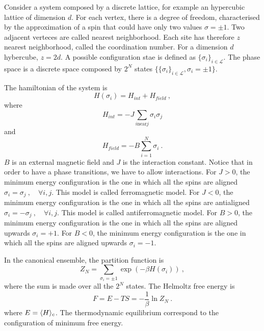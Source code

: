     Consider a system composed by a discrete lattice, for example an hypercubic lattice of dimension $d$. For each vertex, there is a degree of freedom, characterised by the approximation of a spin that could have only two values $\sigma = \pm 1$. Two adjacent verteces are called nearest neighborhood. Each site has therefore $z$ nearest neighborhood, called the coordination number. For a dimension $d$ hybercube, $z = 2 d$. A possible configuration stae is defined as $\{\sigma_i\}_{i \in \mathcal L}$. The phase space is a discrete space composed by $2^N$ states $\{\{\sigma_i\}_{i \in \mathcal L}, \sigma_i = \pm 1\}$. 

    The hamiltonian of the system is 
    \begin{equation*}
        H(\sigma_i) = H_{int} + H_{field} ~,
    \end{equation*}
    where
    \begin{equation*}
        H_{int} = - J \sum_{i \text{near} j} \sigma_i \sigma_j 
    \end{equation*}
    and 
    \begin{equation*}
        H_{field} = - B \sum_{i=1}^{N} \sigma_i ~.
    \end{equation*}
    $B$ is an external magnetic field and $J$ is the interaction constant. Notice that in order to have a phase transitions, we have to allow interactions. For $J > 0$, the minimum energy configuration is the one in which all the spins are aligned $\sigma_i = \sigma_j ~, \quad \forall i, j$. This model is called ferromagnetic model. For $J < 0$, the minimum energy configuration is the one in which all the spins are antialigned $\sigma_i = - \sigma_j ~, \quad \forall i, j$. This model is called antiferromagnetic model. For $B > 0$, the minimum energy configuration is the one in which all the spins are aligned upwards $\sigma_i = + 1$. For $B < 0$, the minimum energy configuration is the one in which all the spins are aligned upwards $\sigma_i = - 1$. 

    In the canonical ensemble, the partition function is 
    \begin{equation*}
        Z_N = \sum_{\sigma_i = \pm 1} \exp(- \beta H(\sigma_i)) ~,
    \end{equation*}
    where the sum is made over all the $2^N$ states. The Helmoltz free energy is 
    \begin{equation*}
        F = E - TS = - \frac{1}{\beta} \ln Z_N ~.
    \end{equation*}
    where $E = \langle H\rangle_c$. The thermodynamic equilibrium correspond to the configuration of minimum free energy.

